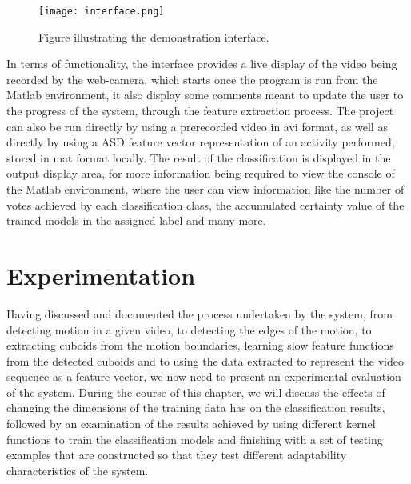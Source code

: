 \documentclass[11pt]{report}
\begin{document}
\begin{figure}
    \centering
    \texttt{[image: interface.png]}
    \caption{Figure illustrating the demonstration interface.}
    \label{fig:interface}
\end{figure}

In terms of functionality, the interface provides a live display of the video being recorded by the web-camera, which starts once the program is run from the Matlab environment, it also display some comments meant to update the user to the progress of the system, through the feature extraction process. The project can also be run directly by using a prerecorded video in avi format, as well as directly by using a ASD feature vector representation of an activity performed, stored in mat format locally. The result of the classification is displayed in the output display area, for more information being required to view the console of the Matlab environment, where the user can view information like the number of votes achieved by each classification class, the accumulated certainty value of the trained models in the assigned label and many more. \\

\clearpage

\chapter{Experimentation}
Having discussed and documented the process undertaken by the system, from detecting motion in a given video, to detecting the edges of the motion, to extracting cuboids from the motion boundaries, learning slow feature functions from the detected cuboids and to using the data extracted to represent the video sequence as a feature vector, we now need to present an experimental evaluation of the system. During the course of this chapter, we will discuss the effects of changing the dimensions of the training data has on the classification results, followed by an examination of the results achieved by using different kernel functions to train the classification models and finishing with a set of testing examples that are constructed so that they test different adaptability characteristics of the system.\\
\end{document}
